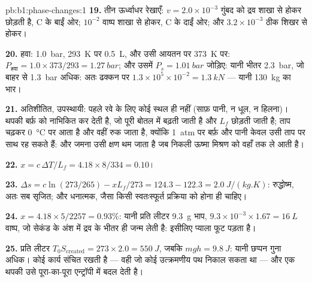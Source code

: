 \begin{solution}{pb:b1:phase-changes:1}
\textbf{19.} तीन ऊर्ध्वाधर रेखाएँ: $v = 2.0 \times 10^{-3}$ गुंबद को द्रव शाखा
से होकर छोड़ती है, C के बाईं ओर; $10^{-2}$ वाष्प शाखा से होकर, C के दाईं
ओर; और $3.2 \times 10^{-3}$ ठीक शिखर से होकर।

\textbf{20.} हवा: \qty{1.0}{bar}, \qty{293}{K} पर \qty{0.5}{L}, और उसी आयतन
पर \qty{373}{K} पर: $P_{\text{हवा}} = 1.0 \times 373/293 = \qty{1.27}{bar}$; और उसमें
$P_s = \qty{1.01}{bar}$ जोड़िए: यानी भीतर \qty{2.3}{bar}, जो बाहर से
\qty{1.3}{bar} अधिक: अतः ढक्कन पर $1.3 \times 10^5 \times 10^{-2} = \qty{1.3}{kN}$ ---
यानी \qty{130}{kg} का भार।

\textbf{21.} अतिशीतित, उपस्थायी: पहले रवे के लिए कोई  स्थल ही नहीं
(साफ़ पानी, न धूल, न हिलना)। थपकी बर्फ़ को नाभिकित कर देती है, जो पूरी बोतल
में बढ़ती जाती है और $L_f$ छोड़ती जाती है; ताप चढ़कर
\qty{0}{\degreeCelsius} पर आता है और वहीं रुक जाता है, क्योंकि \qty{1}{atm}
पर बर्फ़ और पानी केवल उसी ताप पर साथ रह सकते हैं: और जमना उसी क्षण थम जाता
है जब निकली ऊष्मा मिश्रण को वहाँ तक ले आती है।

\textbf{22.} $x = c\,\Delta T/L_f = 4.18 \times 8/334 = 0.10$।

\textbf{23.} $\Delta s = c\ln(273/265) - xL_f/273 = 124.3 - 122.3 =
\qty{+2.0}{J/(kg.K)}$: रुद्धोष्म, अतः सब सृजित; और धनात्मक, जैसा किसी
स्वतःस्फूर्त प्रक्रिया को होना ही चाहिए।

\textbf{24.} $x = 4.18 \times 5/2257 = 0.93\%$: यानी प्रति लीटर \qty{9.3}{g} भाप,
$9.3 \times 10^{-3} \times 1.67 = \qty{16}{L}$ वाष्प, जो सेकंड के अंश में द्रव के
भीतर ही जन्म लेती है: इसीलिए प्याला फूट पड़ता है।

\textbf{25.} प्रति लीटर $T_0S_{\mathrm{created}} = 273 \times 2.0 = \qty{550}{J}$,
जबकि $mgh = \qty{9.8}{J}$: यानी छप्पन गुना अधिक। कोई  कार्य
संचित रखती है --- वही जो कोई उत्क्रमणीय पथ निकाल सकता था --- और एक थपकी उसे
पूरा-का-पूरा एन्ट्रॉपी में बदल देती है।
\end{solution}
